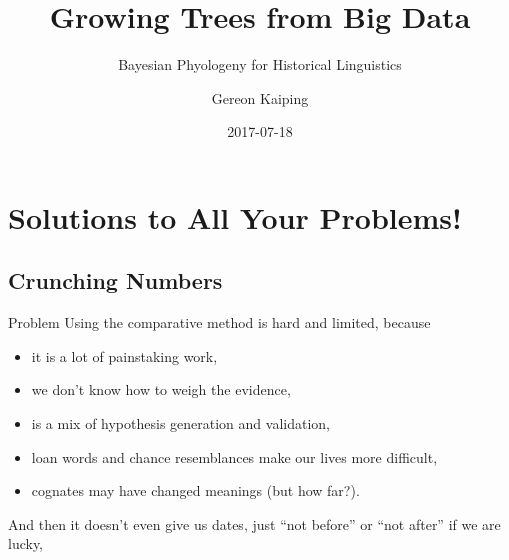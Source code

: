 \documentclass[9pt]{beamer}
\title{Growing Trees from Big Data}
\subtitle{Bayesian Phyologeny for Historical Linguistics}
\author{Gereon Kaiping}
\date{2017-07-18}
\begin{document}
\begin{frame}[plain]
  \titlepage
\end{frame}
\begin{frame}
  \tableofcontents
\end{frame}
\section{Solutions to All Your Problems!}
\subsection{Crunching Numbers}
\begin{frame}{Problem}
  Using the comparative method is hard and limited, because
  \begin{itemize}
  \item it is a lot of painstaking work,
  \item we don't know how to weigh the evidence,
  \item is a mix of hypothesis generation and validation,
  \item loan words and chance resemblances make our lives more difficult,
  \item cognates may have changed meanings (but how far?).
  \end{itemize}
  \pause
  And then it doesn't even give us dates, just “not before” or “not after” if we are lucky,
\end{frame}
\end{document}
